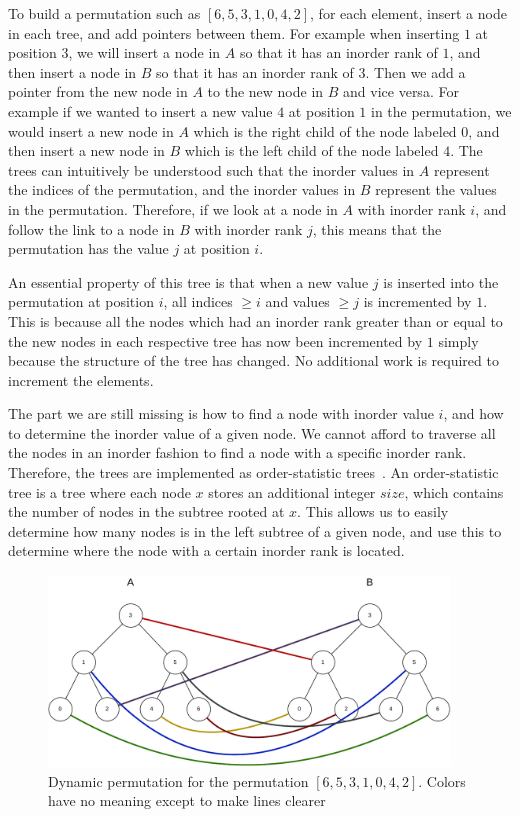 To build a permutation such as $[6,5,3,1,0,4,2]$, for each element, insert a node in each
tree, and add pointers between them. For example when inserting $1$ at position $3$, we
will insert a node in $A$ so that it has an inorder rank of $1$, and then insert a node in
$B$ so that it has an inorder rank of $3$. Then we add a pointer from the new node in $A$
to the new node in $B$ and vice versa. For example if we wanted to insert a new value $4$ at
position $1$ in the permutation, we would insert a new node in $A$ which is the right
child of the node labeled $0$, and then insert a new node in $B$ which is the left child
of the node labeled $4$. The trees can intuitively be understood such that the inorder
values in $A$ represent the indices of the permutation, and the inorder values in $B$
represent the values in the permutation. Therefore, if we look at a node in $A$ with
inorder rank $i$, and follow the link to a node in $B$ with inorder rank $j$, this means
that the permutation has the value $j$ at position $i$.

An essential property of this tree is that when a new value $j$ is inserted into the
permutation at position $i$, all indices $\geq i$ and values $\geq j$ is incremented by
$1$. This is because all the nodes which had an inorder rank greater than or equal to the
new nodes in each respective tree has now been incremented by $1$ simply because the
structure of the tree has changed. No additional work is required to increment the
elements. 

The part we are still missing is how to find a node with inorder value $i$, and how to
determine the inorder value of a given node. We cannot afford to traverse all the nodes in
an inorder fashion to find a node with a specific inorder rank. Therefore, the trees are
implemented as order-statistic trees~\cite[340]{CLRS}. An order-statistic tree is a tree
where each node $x$ stores an additional integer $size$, which contains the number of
nodes in the subtree rooted at $x$. This allows us to easily determine how many nodes is
in the left subtree of a given node, and use this to determine where the node with a
certain inorder rank is located.

\begin{figure}
    \begin{center}
        \includegraphics[width=0.95\textwidth]{figures/dynamicpermutation.drawio.pdf}
    \end{center}
    \caption{Dynamic permutation for the permutation $[6,5,3,1,0,4,2]$. Colors have no meaning except to make lines clearer}
    \label{fig:dynamicpermutation}
\end{figure}


